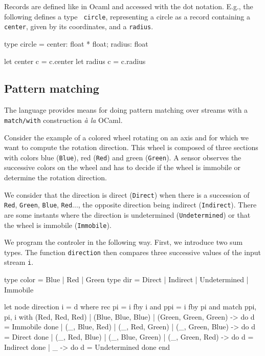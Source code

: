 \documentclass[11pt,titlepage,twoside]{report}
\newcommand{\ocaml}{{\sf OCaml}}
\begin{document}
Records are defined like in Ocaml and accessed with the dot notation. E.g.,
the following defines a type {\tt
  circle}, representing a circle as a record containing a {\tt
  center}, given by its coordinates, and a {\tt radius}.
\begin{runverbatim}
type circle = { center: float * float; radius: float }

let center c = c.center
let radius c = c.radius
\end{runverbatim}
  
\subsection{Pattern matching}
The language provides means for doing pattern matching over streams
with a \verb-match/with- construction {\em \`a la} \ocaml.

Consider the example of a colored wheel rotating on an axis and for
which we want to compute the rotation direction. This wheel is
composed of three sections with colors blue (\verb-Blue-), red
(\verb-Red-) and green (\verb-Green-).  A sensor observes the
successive colors on the wheel and has to decide if the wheel is
immobile or determine the rotation direction.

We consider that the direction is direct (\verb-Direct-) when there is
a succession of \verb-Red-, \verb-Green-, \verb-Blue-, \verb-Red-...,
the opposite direction being indirect (\verb-Indirect-). There are
some instants where the direction is undetermined
(\verb-Undetermined-) or that the wheel is immobile (\verb-Immobile-).

We program the controler in the following way. First, we introduce two
sum types.  The function \verb-direction- then compares three
successive values of the input stream \verb-i-.
\begin{runverbatim}
type color = Blue | Red | Green
type dir = Direct | Indirect | Undetermined | Immobile
\end{runverbatim}

\begin{runverbatim}
let node direction i = d where
  rec pi = i fby i
  and ppi = i fby pi
  and match ppi, pi, i with
    (Red, Red, Red) | (Blue, Blue, Blue) | (Green, Green, Green) ->
         do d = Immobile done
  | (_, Blue, Red) | (_, Red, Green) | (_, Green, Blue) -> 
         do d = Direct done
  | (_, Red, Blue) | (_, Blue, Green) | (_, Green, Red) -> 
         do d = Indirect done
  | _ -> do d = Undetermined done
  end
\end{runverbatim}
\end{document}
